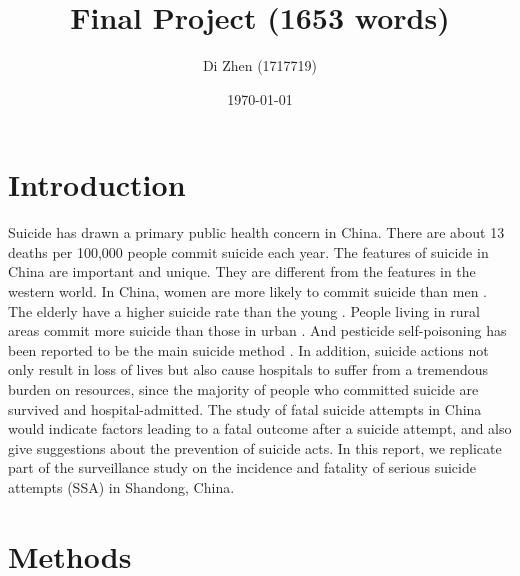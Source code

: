 \documentclass[a4paper]{article}
\begin{document}
\title{Final Project (1653 words)}
\author{Di Zhen (1717719)}
\date{\today}
\maketitle
\newpage

\section*{Introduction}

Suicide has drawn a primary public health concern in China. There are about 13 deaths per 100,000 people commit suicide each year. The features of suicide in China are important and unique. They are different from the features in the western world. In China, women are more likely to commit suicide than men \citep{ChenZReportontheThird}. The elderly have a higher suicide rate than the young \citep{PhillipsMR}. People living in rural areas commit more suicide than those in urban \citep{YangGH}. And pesticide self-poisoning has been reported to be the main suicide method \citep{AjdacicGrossV}. In addition, suicide actions not only result in loss of lives but also cause hospitals to suffer from a tremendous burden on resources, since the majority of people who committed suicide are survived and hospital-admitted.
\newline
\newline
The study of fatal suicide attempts in China would indicate factors leading to a fatal outcome after a suicide attempt, and also give suggestions about the prevention of suicide acts. In this report, we replicate part of the surveillance study \citep{Sun2015} on the incidence and fatality of serious suicide attempts (SSA) in Shandong, China. 

\section*{Methods}
\end{document}
